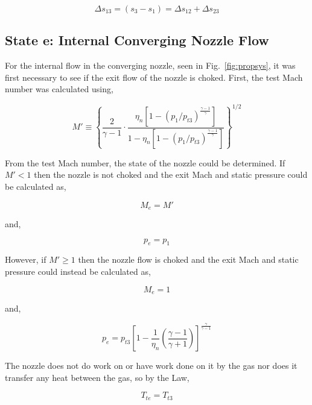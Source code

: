 \documentclass[conf]{new-aiaa} %
\begin{document}
\begin{equation}
    \label{eqn:dels13}
    \Delta s_{13}=(s_3-s_1)=\Delta s_{12}+\Delta s_{23}
\end{equation}

\subsection{State e: Internal Converging Nozzle Flow}
For the internal flow in the converging nozzle, seen in Fig.~\ref{fig:propsys}, it was first necessary to see if the exit flow of the nozzle is choked. First, the test Mach number was calculated using,

\begin{equation}
    \label{eqn:M'}
    M'\equiv\left\{\frac{2}{\gamma-1}\cdot\frac{\eta_n\left[1-\left(p_1/p_{t3}\right)^{\frac{\gamma-1}{\gamma}}\right]}{1-\eta_n\left[1-\left(p_1/p_{t3}\right)^{\frac{\gamma-1}{\gamma}}\right]}\right\}^{1/2}
\end{equation}

From the test Mach number, the state of the nozzle could be determined. If $M'<1$ then the nozzle is not choked and the exit Mach and static pressure could be calculated as,

\begin{equation}
    \label{eqn:nchokeMe}
    M_e=M'
\end{equation}

and,

\begin{equation}
    \label{eqn:nchokepe}
    p_e=p_1
\end{equation}

However, if $M'\geq1$ then the nozzle flow is choked and the exit Mach and static pressure could instead be calculated as,

\begin{equation}
    \label{eqn:chokeMe}
    M_e=1
\end{equation}

and,

\begin{equation}
    \label{eqn:chokepe}
    p_e=p_{t3}\left[1-\frac{1}{\eta_n}\left(\frac{\gamma-1}{\gamma+1}\right)\right]^\frac{\gamma}{\gamma-1}
\end{equation}

The nozzle does not do work on or have work done on it by the gas nor does it transfer any heat between the gas, so by the  Law,

\begin{equation}
    \label{eqn:Tte}
    T_{te}=T_{t3}
\end{equation}
\end{document}
